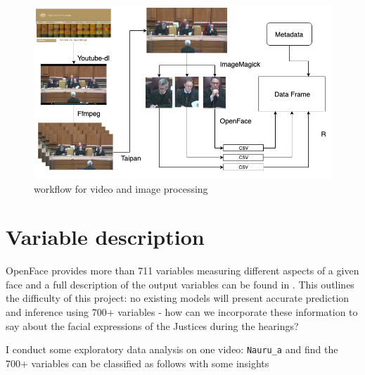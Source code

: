 \documentclass{monashthesis}
\begin{document}
\begin{figure}

{\centering \includegraphics[width=1\linewidth]{figures/workflow} 

}

\caption{workflow for video and image processing \label{fig:workflow}}\label{fig:unnamed-chunk-1}
\end{figure}

\hypertarget{variable-description}{%
\section{Variable description}\label{variable-description}}

OpenFace provides more than 711 variables measuring different aspects of a given face and a full description of the output variables can be found in \textcite{baltrusaitis2018openface}. This outlines the difficulty of this project: no existing models will present accurate prediction and inference using 700+ variables - how can we incorporate these information to say about the facial expressions of the Justices during the hearings?

I conduct some exploratory data analysis on one video: \texttt{Nauru\_a} and find the 700+ variables can be classified as follows with some insights
\end{document}
